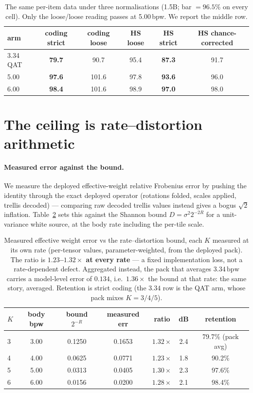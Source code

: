 \documentclass[11pt,a4paper]{article}
\newcommand{\bpw}{\,\mathrm{bpw}}
\begin{document}
\begin{table}[t]
\centering\small
\caption{The same per-item data under three normalisations (1.5B; bar $=96.5\%$ on every cell).
Only the loose/loose reading passes at 5.00\,bpw. We report the middle row.}
\label{tab:normalisation}
\begin{tabular}{lccccc}
\toprule
arm & coding strict & coding loose & HS loose & HS strict & HS chance-corrected\\
\midrule
3.34 QAT & \textbf{79.7} & 90.7 & 95.4 & \textbf{87.3} & 91.7\\
5.00     & \textbf{97.6} & 101.6 & 97.8 & \textbf{93.6} & 96.0\\
6.00     & \textbf{98.4} & 101.6 & 98.9 & \textbf{97.0} & 98.0\\
\bottomrule
\end{tabular}
\end{table}

\section{The ceiling is rate--distortion arithmetic}
\label{sec:ceiling}

\paragraph{Measured error against the bound.} We measure the deployed effective-weight relative
Frobenius error by pushing the identity through the exact deployed operator (rotations folded,
scales applied, trellis decoded) --- comparing raw decoded trellis values instead gives a bogus
$\sqrt2$ inflation. Table~\ref{tab:rd} sets this against the Shannon bound $D=\sigma^2 2^{-2R}$
for a unit-variance white source, at the body rate including the per-tile scale.

\begin{table}[t]
\centering\small
\caption{Measured effective weight error vs the rate--distortion bound, each $K$ measured at its
own rate (per-tensor values, parameter-weighted, from the deployed pack). The ratio is
\textbf{$1.23$--$1.32\times$ at every rate} --- a fixed implementation loss, not a rate-dependent
defect. Aggregated instead, the pack that averages $3.34\bpw$ carries a model-level error of
$0.134$, i.e.\ $1.36\times$ the bound at that rate: the same story, averaged. Retention is strict
coding (the $3.34$ row is the QAT arm, whose pack mixes $K=3/4/5$).}
\label{tab:rd}
\begin{tabular}{lcccccc}
\toprule
$K$ & body bpw & bound $2^{-R}$ & measured err & ratio & dB & retention\\
\midrule
3 & 3.00 & 0.1250 & 0.1653 & $1.32\times$ & 2.4 & 79.7\% (pack avg)\\
4 & 4.00 & 0.0625 & 0.0771 & $1.23\times$ & 1.8 & 90.2\%\\
5 & 5.00 & 0.0313 & 0.0405 & $1.30\times$ & 2.3 & 97.6\%\\
6 & 6.00 & 0.0156 & 0.0200 & $1.28\times$ & 2.1 & 98.4\%\\
\bottomrule
\end{tabular}
\end{table}
\end{document}
